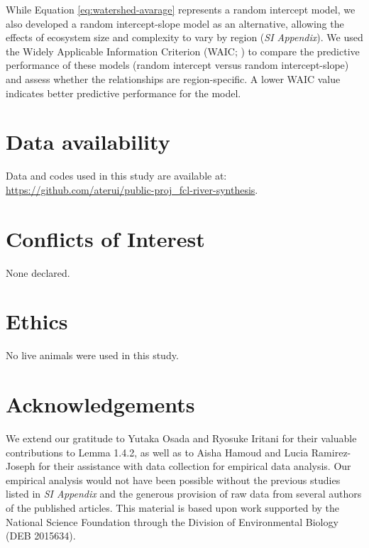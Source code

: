 \documentclass[11pt, class=article, crop=false]{standalone}
\theoremstyle{definition}
\begin{document}
While Equation \ref{eq:watershed-avarage} represents a random intercept model, we also developed a random intercept-slope model as an alternative, allowing the effects of ecosystem size and complexity to vary by region (\textit{SI Appendix}).
We used the Widely Applicable Information Criterion (WAIC; \citep{watanabe_asymptotic_2010}) to compare the predictive performance of these models (random intercept versus random intercept-slope) and assess whether the relationships are region-specific.
A lower WAIC value indicates better predictive performance for the model.

\section{Data availability}

Data and codes used in this study are available at:
\url{https://github.com/aterui/public-proj_fcl-river-synthesis}.

\section{Conflicts of Interest}

None declared.

\section{Ethics}

No live animals were used in this study.

\section{Acknowledgements}

We extend our gratitude to Yutaka Osada and Ryosuke Iritani for their valuable contributions to Lemma 1.4.2, as well as to Aisha Hamoud and Lucia Ramirez-Joseph for their assistance with data collection for empirical data analysis.
Our empirical analysis would not have been possible without the previous studies listed in \textit{SI Appendix} and the generous provision of raw data from several authors of the published articles.
This material is based upon work supported by the National Science Foundation through the Division of Environmental Biology (DEB 2015634).

\newpage


\end{document}

